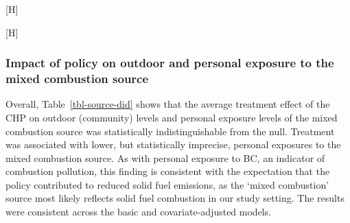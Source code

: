 \documentclass[
  letterpaper,
  DIV=11,
  numbers=noendperiod]{scrartcl}
\makeatletter
\renewenvironment{figure}%
   {\renewcommand\familydefault\sfdefault
    \@float{figure}}
   {\end@float}
\makeatother
\begin{document}
\begin{figure}[H]


\caption{\label{fig-source-figure}Source profiles for the 4-factor PMF
solution to the sum of elements, ions, elemental carbon, and organic
carbon for outdoor and personal PM\textsubscript{2.5} exposure
measurements. The lines separate the major contributing species to each
source.}

\end{figure}%

\begin{figure}[H]


\caption{\label{fig-source-season}Arithmetic mean dispersion normalized
source contributions found from the 4-factor PMF solution for \textbf{A}
outdoor and \textbf{B} personal PM\textsubscript{2.5} exposure samples
by year the group received treatment.}

\end{figure}%

\subsubsection{Impact of policy on outdoor and personal exposure to the
mixed combustion
source}\label{impact-of-policy-on-outdoor-and-personal-exposure-to-the-mixed-combustion-source}

Overall, Table~\ref{tbl-source-did} shows that the average treatment
effect of the CHP on outdoor (community) levels and personal exposure
levels of the mixed combustion source was statistically
indistinguishable from the null. Treatment was associated with lower,
but statistically imprecise, personal exposures to the mixed combustion
source. As with personal exposure to BC, an indicator of combustion
pollution, this finding is consistent with the expectation that the
policy contributed to reduced solid fuel emissions, as the `mixed
combustion' source most likely reflects solid fuel combustion in our
study setting. The results were consistent across the basic and
covariate-adjusted models.
\end{document}
